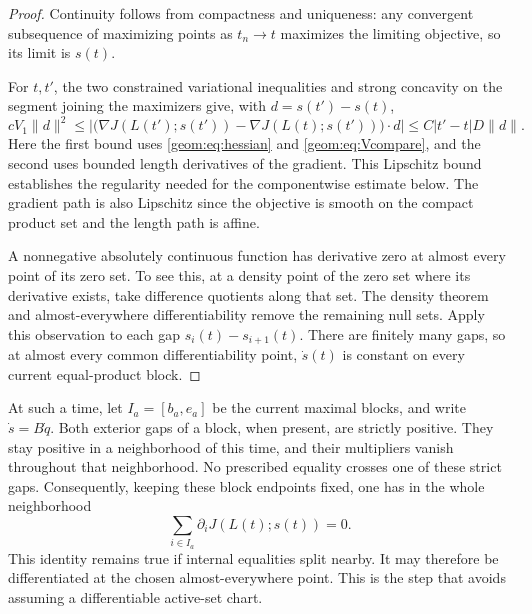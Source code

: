 \begin{proof}
Continuity follows from compactness and uniqueness: any convergent
subsequence of maximizing points as \(t_n\to t\) maximizes the limiting
objective, so its limit is \(s(t)\).

For \(t,t'\), the two constrained variational inequalities and strong
concavity on the segment joining the maximizers give, with
\(d=s(t')-s(t)\),
\[
 cV_1\|d\|^2
 \le \left|\bigl(\nabla J(L(t');s(t'))
                 -\nabla J(L(t);s(t'))\bigr)\cdot d\right|
 \le C|t'-t|D\|d\|.
\]
Here the first bound uses \eqref{geom:eq:hessian} and
\eqref{geom:eq:Vcompare}, and the second uses bounded length derivatives
of the gradient.  This Lipschitz bound establishes the regularity
needed for the componentwise estimate below.
The gradient path is also Lipschitz since the objective is smooth
on the compact product set and the length path is affine.

A nonnegative absolutely continuous function has derivative zero
at almost every point of its zero set.  To see this, at a density
point of the zero set where its derivative exists, take difference
quotients along that set.  The density theorem and almost-everywhere
differentiability remove the remaining null sets.
Apply this observation to each gap \(s_i(t)-s_{i+1}(t)\).
There are finitely many gaps, so at almost every common differentiability
point, \(\dot s(t)\) is constant on every current equal-product block.
\end{proof}

At such a time, let \(I_a=[b_a,e_a]\) be the current maximal blocks,
and write \(\dot s=B\dot q\).  Both exterior gaps of a block, when
present, are strictly positive.  They stay positive in a neighborhood
of this time, and their multipliers vanish throughout that neighborhood.
No prescribed equality crosses one of these strict gaps.  Consequently,
keeping these block endpoints fixed, one has in the whole neighborhood
\begin{equation}
 \sum_{i\in I_a}\partial_iJ(L(t);s(t))=0.          \label{geom:eq:blockstationarity}
\end{equation}
This identity remains true if internal equalities split nearby.
It may therefore be differentiated at the chosen almost-everywhere
point.  This is the step that avoids assuming a differentiable
active-set chart.

